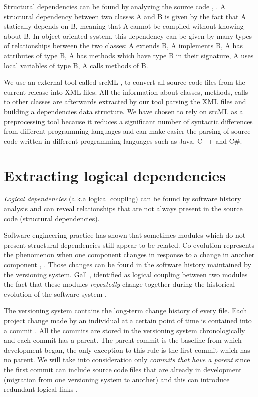 \documentclass[12pt]{mitthesis}
\begin{document}
Structural dependencies can be found by analyzing the source code \cite{Sangal:2005:UDM:1094811.1094824}, \cite{CalloArias2011}. A structural dependency between two classes A and B is given by the fact that A statically depends on B, meaning that A cannot be compiled without knowing about B. In object oriented system, this dependency can be given by many types of relationships between the two classes: A extends B, A implements B, A has attributes of type B, A has methods which have type B in their signature, A uses local variables of type B, A calls methods of B.


 We use an external tool called srcML \cite{2003:XLC:851042.857028},
\cite{Collard:2011:LTF:2067850.2068011} to convert all source code files from the current release into XML files. All the information about classes, methods, calls to other classes are afterwards extracted by our tool parsing the XML files and building a dependencies data structure. We have chosen to rely on srcML as a preprocessing tool because it reduces a significant number of syntactic differences from different programming languages and can make easier the parsing of source code written in different programming languages such as Java, C++ and C\#.    

\section{Extracting logical dependencies}

\textit{Logical dependencies} (a.k.a logical coupling) can be found by software history analysis and can reveal relationships that are not always present in the source code (structural dependencies).  

Software engineering practice has shown that sometimes modules which do not present structural dependencies still appear to be related. Co-evolution represents the phenomenon when one component changes in response to a change in another component \cite{Yu:2007:UCC:1231330.1231370}, \cite{5166450}. Those changes can be found in the software history maintained by the versioning system. Gall \cite{Gall:1998:DLC:850947.853338}, \cite{Gall:2003:CRH:942803.943741} identified as logical coupling between two modules the fact that these modules  \textit{repeatedly} change together during the historical evolution of the software system \cite{6606615}.

The versioning system contains the long-term change history of every file. Each project change made by an individual at a certain point of time is contained into a commit \cite{svn}. All the commits are stored in the versioning system chronologically and each commit has a parent. The parent commit is the baseline from which development began, the only exception to this rule is the first commit which has no parent. We will take into consideration only \textit{commits that have a parent} since the first commit can include source code files that are already in development (migration from one versioning system to another) and this can introduce redundant logical links \cite{DBLP:journals/jss/AjienkaC17}. 
\end{document}
